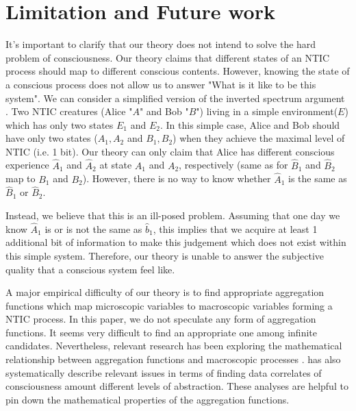 \documentclass[utf8]{article}
\begin{document}
    \section{Limitation and Future work}
        It's important to clarify that our theory does not intend to solve the hard problem of consciousness\citep{chalmers1995facing}. Our theory claims that different states of an NTIC process should map to different conscious contents. However, knowing the state of a conscious process does not allow us to answer "What is it like to be this system"\citep{nagel1974like}. We can consider a simplified version of the inverted spectrum argument \citep{Shoemaker1982-SHOTIS, Block1990-BLOIE, Locke1979-LOCTCE-2}. Two NTIC creatures (Alice "$A$" and Bob "$B$") living in a simple environment($E$) which has only two states $E_1$ and $E_2$. In this simple case, Alice and Bob should have only two states ($A_1, A_2$ and $B_1, B_2$) when they achieve the maximal level of NTIC (i.e. 1 bit). Our theory can only claim that Alice has different conscious experience $\hat{A}_1$ and $\hat{A}_2$ at state $A_1$ and $A_2$, respectively (same as for $\hat{B}_1$ and $\hat{B}_2$ map to $B_1$ and $B_2$). However, there is no way to know whether $\hat{A}_1$ is the same as $\hat{B}_1$ or $\hat{B}_2$. 
        
        Instead, we believe that this is an ill-posed problem. Assuming that one day we know $\hat{A}_1$ is or is not the same as $\hat{b}_1$, this implies that we acquire at least 1 additional bit of information to make this judgement which does not exist within this simple system. Therefore, our theory is unable to answer the subjective quality that a conscious system feel like. 
        
        
    
        A major empirical difficulty of our theory is to find appropriate aggregation functions which map microscopic variables to macroscopic variables forming a NTIC process. In this paper, we do not speculate any form of aggregation functions. It seems very difficult to find an appropriate one among infinite candidates\citep{price2007causation}. Nevertheless, relevant research has been exploring the mathematical relationship between aggregation functions and macroscopic processes \citep{PFANTE.2014}. \cite{Gamez2016} has also
        systematically describe relevant issues in terms of finding data correlates of consciousness amount different levels of abstraction. These analyses are helpful to pin down the mathematical properties of the aggregation functions. 
        
\end{document}
